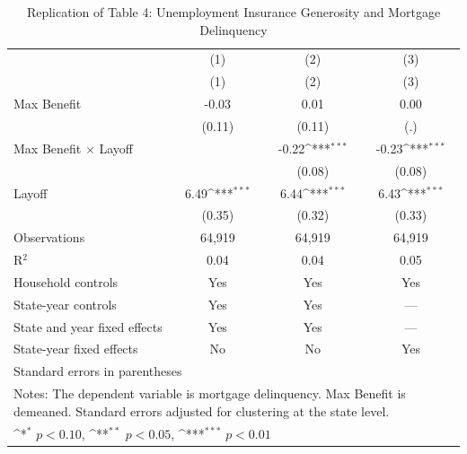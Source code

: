 \begin{table}[htbp]\centering
\def\sym#1{\ifmmode^{#1}\else\(^{#1}\)\fi}
\caption{Replication of Table 4: Unemployment Insurance Generosity and Mortgage Delinquency}
\begin{tabular}{l*{3}{c}}
\toprule
                    &\multicolumn{1}{c}{(1)}&\multicolumn{1}{c}{(2)}&\multicolumn{1}{c}{(3)}\\
                    &\multicolumn{1}{c}{(1)}&\multicolumn{1}{c}{(2)}&\multicolumn{1}{c}{(3)}\\
\midrule
Max Benefit         &       -0.03         &        0.01         &        0.00         \\
                    &      (0.11)         &      (0.11)         &         (.)         \\
\addlinespace
Max Benefit $\times$ Layoff&                     &       -0.22\sym{***}&       -0.23\sym{***}\\
                    &                     &      (0.08)         &      (0.08)         \\
\addlinespace
Layoff              &        6.49\sym{***}&        6.44\sym{***}&        6.43\sym{***}\\
                    &      (0.35)         &      (0.32)         &      (0.33)         \\
\midrule
Observations        &      64,919         &      64,919         &      64,919         \\
R$^2$               &        0.04         &        0.04         &        0.05         \\
Household controls  &         Yes         &         Yes         &         Yes         \\
State-year controls &         Yes         &         Yes         &         ---         \\
State and year fixed effects&         Yes         &         Yes         &         ---         \\
State-year fixed effects&          No         &          No         &         Yes         \\
\bottomrule
\multicolumn{4}{l}{\footnotesize Standard errors in parentheses}\\
\multicolumn{4}{l}{\footnotesize Notes: The dependent variable is mortgage delinquency. Max Benefit is demeaned. Standard errors adjusted for clustering at the state level.}\\
\multicolumn{4}{l}{\footnotesize \sym{*} \(p<0.10\), \sym{**} \(p<0.05\), \sym{***} \(p<0.01\)}\\
\end{tabular}
\end{table}
